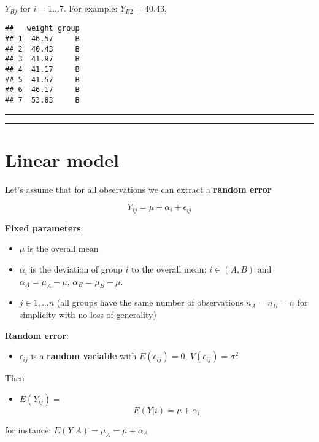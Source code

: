 \documentclass[
]{book}
\providecommand{\tightlist}{%
  \setlength{\itemsep}{0pt}\setlength{\parskip}{0pt}}
\begin{document}
\(Y_{Bj}\) for \(i=1...7\). For example: \(Y_{B2}=40.43\),

\begin{verbatim}
##   weight group
## 1  46.57     B
## 2  40.43     B
## 3  41.97     B
## 4  41.17     B
## 5  41.57     B
## 6  46.17     B
## 7  53.83     B
\end{verbatim}

\begin{center}\rule{0.5\linewidth}{0.5pt}\end{center}

\begin{center}\rule{0.5\linewidth}{0.5pt}\end{center}

\hypertarget{linear-model-1}{%
\section{Linear model}\label{linear-model-1}}

Let's assume that for all observations we can extract a
\textbf{random error}

\[Y_{ij} = \mu + \alpha_i +\epsilon_{ij}\]

\textbf{Fixed parameters}:

\begin{itemize}
\tightlist
\item
  \(\mu\) is the overall mean
\item
  \(\alpha_i\) is the deviation of group \(i\) to the overall mean: \(i \in (A,B)\) and \(\alpha_A=\mu_A-\mu\), \(\alpha_B=\mu_B-\mu\).
\item
  \(j \in {1,...n}\) (all groups have the same number of observations \(n_A=n_B=n\) for simplicity with no loss of generality)
\end{itemize}

\textbf{Random error}:

\begin{itemize}
\tightlist
\item
  \(\epsilon_{ij}\) is a \textbf{random variable} with \(E(\epsilon_{ij})=0\), \(V(\epsilon_{ij})=\sigma^2\)
\end{itemize}

Then

\begin{itemize}
\tightlist
\item
  \(E(Y_{ij})=\) \[E(Y|i)=\mu + \alpha_i\]
\end{itemize}

for instance: \(E(Y|A)=\mu_A=\mu + \alpha_A\)
\end{document}
